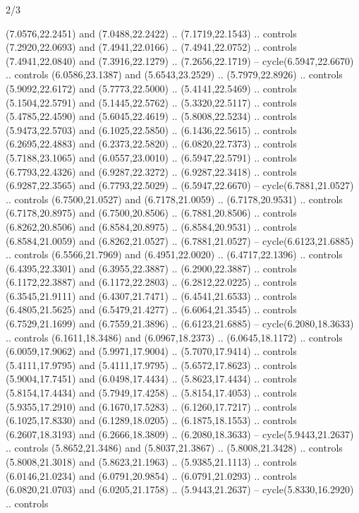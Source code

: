 \begin{flagdescription}{2/3}
\begin{scope}[yshift=\flagwidth,scale=\flagwidth/1241.93737]
\begin{scope}[y=-1mm, x=1mm,draw=gold,fill=blue,line join=miter,miter limit=4,line width=1.8\lw]
{  (7.0576,22.2451) and (7.0488,22.2422) .. (7.1719,22.1543) .. controls
  (7.2920,22.0693) and (7.4941,22.0166) .. (7.4941,22.0752) .. controls
  (7.4941,22.0840) and (7.3916,22.1279) .. (7.2656,22.1719) --
  cycle(6.5947,22.6670) .. controls (6.0586,23.1387) and (5.6543,23.2529) ..
  (5.7979,22.8926) .. controls (5.9092,22.6172) and (5.7773,22.5000) ..
  (5.4141,22.5469) .. controls (5.1504,22.5791) and (5.1445,22.5762) ..
  (5.3320,22.5117) .. controls (5.4785,22.4590) and (5.6045,22.4619) ..
  (5.8008,22.5234) .. controls (5.9473,22.5703) and (6.1025,22.5850) ..
  (6.1436,22.5615) .. controls (6.2695,22.4883) and (6.2373,22.5820) ..
  (6.0820,22.7373) .. controls (5.7188,23.1065) and (6.0557,23.0010) ..
  (6.5947,22.5791) .. controls (6.7793,22.4326) and (6.9287,22.3272) ..
  (6.9287,22.3418) .. controls (6.9287,22.3565) and (6.7793,22.5029) ..
  (6.5947,22.6670) -- cycle(6.7881,21.0527) .. controls (6.7500,21.0527) and
  (6.7178,21.0059) .. (6.7178,20.9531) .. controls (6.7178,20.8975) and
  (6.7500,20.8506) .. (6.7881,20.8506) .. controls (6.8262,20.8506) and
  (6.8584,20.8975) .. (6.8584,20.9531) .. controls (6.8584,21.0059) and
  (6.8262,21.0527) .. (6.7881,21.0527) -- cycle(6.6123,21.6885) .. controls
  (6.5566,21.7969) and (6.4951,22.0020) .. (6.4717,22.1396) .. controls
  (6.4395,22.3301) and (6.3955,22.3887) .. (6.2900,22.3887) .. controls
  (6.1172,22.3887) and (6.1172,22.2803) .. (6.2812,22.0225) .. controls
  (6.3545,21.9111) and (6.4307,21.7471) .. (6.4541,21.6533) .. controls
  (6.4805,21.5625) and (6.5479,21.4277) .. (6.6064,21.3545) .. controls
  (6.7529,21.1699) and (6.7559,21.3896) .. (6.6123,21.6885) --
  cycle(6.2080,18.3633) .. controls (6.1611,18.3486) and (6.0967,18.2373) ..
  (6.0645,18.1172) .. controls (6.0059,17.9062) and (5.9971,17.9004) ..
  (5.7070,17.9414) .. controls (5.4111,17.9795) and (5.4111,17.9795) ..
  (5.6572,17.8623) .. controls (5.9004,17.7451) and (6.0498,17.4434) ..
  (5.8623,17.4434) .. controls (5.8154,17.4434) and (5.7949,17.4258) ..
  (5.8154,17.4053) .. controls (5.9355,17.2910) and (6.1670,17.5283) ..
  (6.1260,17.7217) .. controls (6.1025,17.8330) and (6.1289,18.0205) ..
  (6.1875,18.1553) .. controls (6.2607,18.3193) and (6.2666,18.3809) ..
  (6.2080,18.3633) -- cycle(5.9443,21.2637) .. controls (5.8652,21.3486) and
  (5.8037,21.3867) .. (5.8008,21.3428) .. controls (5.8008,21.3018) and
  (5.8623,21.1963) .. (5.9385,21.1113) .. controls (6.0146,21.0234) and
  (6.0791,20.9854) .. (6.0791,21.0293) .. controls (6.0820,21.0703) and
  (6.0205,21.1758) .. (5.9443,21.2637) -- cycle(5.8330,16.2920) .. controls
}
\end{scope}
\end{scope}
\end{flagdescription}
